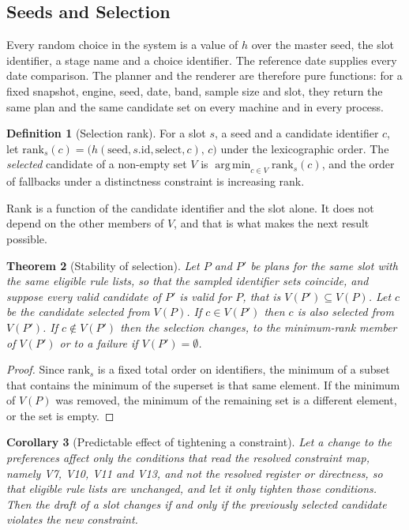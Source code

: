 \documentclass[11pt]{article}
\newtheorem{theorem}{Theorem}[section]
\newtheorem{corollary}[theorem]{Corollary}
\theoremstyle{definition}
\newtheorem{definition}[theorem]{Definition}
\theoremstyle{remark}
\newcommand{\rank}{\mathrm{rank}}
\DeclareMathOperator*{\argmin}{arg\,min}
\begin{document}
\subsection{Seeds and Selection}

Every random choice in the system is a value of $h$ over the master seed, the slot identifier, a stage name and a choice identifier. The reference date supplies every date comparison. The planner and the renderer are therefore pure functions: for a fixed snapshot, engine, seed, date, band, sample size and slot, they return the same plan and the same candidate set on every machine and in every process.

\begin{definition}[Selection rank]
For a slot $s$, a seed and a candidate identifier $c$, let $\rank_s(c)=\bigl(h(\mathrm{seed},s.\mathrm{id},\text{select},c),\,c\bigr)$ under the lexicographic order. The \emph{selected} candidate of a non-empty set $V$ is $\argmin_{c\in V}\rank_s(c)$, and the order of fallbacks under a distinctness constraint is increasing rank.
\end{definition}

Rank is a function of the candidate identifier and the slot alone. It does not depend on the other members of $V$, and that is what makes the next result possible.

\begin{theorem}[Stability of selection]\label{thm:stable}
Let $P$ and $P'$ be plans for the same slot with the same eligible rule lists, so that the sampled identifier sets coincide, and suppose every valid candidate of $P'$ is valid for $P$, that is $V(P')\subseteq V(P)$. Let $c$ be the candidate selected from $V(P)$. If $c\in V(P')$ then $c$ is also selected from $V(P')$. If $c\notin V(P')$ then the selection changes, to the minimum-rank member of $V(P')$ or to a failure if $V(P')=\emptyset$.
\end{theorem}
\begin{proof}
Since $\rank_s$ is a fixed total order on identifiers, the minimum of a subset that contains the minimum of the superset is that same element. If the minimum of $V(P)$ was removed, the minimum of the remaining set is a different element, or the set is empty.
\end{proof}

\begin{corollary}[Predictable effect of tightening a constraint]\label{cor:predict}
Let a change to the preferences affect only the conditions that read the resolved constraint map, namely V7, V10, V11 and V13, and not the resolved register or directness, so that eligible rule lists are unchanged, and let it only tighten those conditions. Then the draft of a slot changes if and only if the previously selected candidate violates the new constraint.
\end{corollary}
\end{document}
